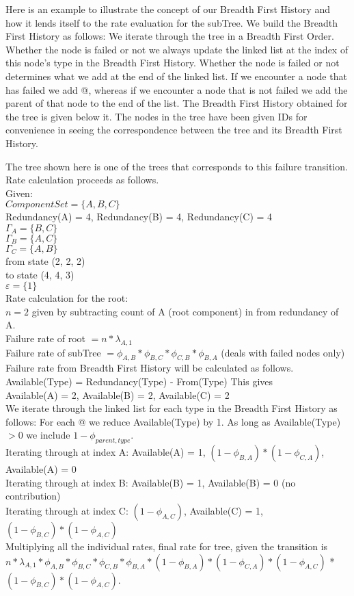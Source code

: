 \documentclass{article}
\begin{document}
Here is an example to illustrate the concept of our Breadth First History and how it lends itself to the rate evaluation for the subTree. We build the Breadth First History as follows: We iterate through the tree in a Breadth First Order. Whether the node is failed or not we always update the linked list at the index of this node's type in the Breadth First History. Whether the node is failed or not determines what we add at the end of the linked list. If we encounter a node that has failed we add @, whereas if we encounter a node that is not failed we add the parent of that node to the end of the list. The Breadth First History obtained for the tree is given below it. The nodes in the tree have been given IDs for convenience in seeing the correspondence between the tree and its Breadth First History.

The tree shown here is one of the trees that corresponds to this failure transition. Rate calculation proceeds as follows. \\
Given: \\ 
$Component Set = \{A, B, C\}$ \\
Redundancy(A) = 4, Redundancy(B) = 4, Redundancy(C) = 4 \\
$\Gamma_{A} = \{B, C\}$ \\
$\Gamma_{B} = \{A, C\}$ \\
$\Gamma_{C} = \{A, B\}$ \\
from state (2, 2, 2) \\ 
to state (4, 4, 3) \\
$\varepsilon = \{1\}$ \\
Rate calculation for the root: \\ $n = 2$ given by subtracting count of A (root component) in from redundancy of A. \\ 
Failure rate of root $= n * \lambda_{A, 1}$ \\
Failure rate of subTree $= \phi_{A, B} * \phi_{B, C} * \phi_{C, B} * \phi_{B, A} $ (deals with failed nodes only)\\
Failure rate from Breadth First History will be calculated as follows. \\
Available(Type) = Redundancy(Type) - From(Type)
This gives \\ Available(A) = 2, Available(B) = 2, Available(C) = 2 \\
We iterate through the linked list for each type in the Breadth First History as follows: 
For each @ we reduce Available(Type) by 1. As long as Available(Type) $> 0$ we include $1 - \phi_{parent, type}$. \\
Iterating through at index A: Available(A) = 1, $ (1 - \phi_{B, A}) * (1 - \phi_{C, A}) $, Available(A) = 0 \\
Iterating through at index B: Available(B) = 1, Available(B) = 0 (no contribution) \\
Iterating through at index C: $ (1 - \phi_{A, C}) $, Available(C) = 1, $ (1 - \phi_{B, C}) * (1 - \phi_{A, C}) $ \\
Multiplying all the individual rates, final rate for tree, given the transition is $ n * \lambda_{A, 1} * \phi_{A, B} * \phi_{B, C} * \phi_{C, B} * \phi_{B, A} * (1 - \phi_{B, A}) * (1 - \phi_{C, A}) * (1 - \phi_{A, C}) $ * $ (1 - \phi_{B, C}) * (1 - \phi_{A, C}) $. 
\end{document}
